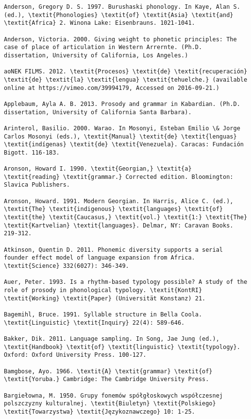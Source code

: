 \begin{verbatim}
Anderson, Gregory D. S. 1997. Burushaski phonology. In Kaye, Alan S. (ed.), \textit{Phonologies} \textit{of} \textit{Asia} \textit{and} \textit{Africa} 2. Winona Lake: Eisenbrauns. 1021-1041.

Anderson, Victoria. 2000. Giving weight to phonetic principles: The case of place of articulation in Western Arrernte. (Ph.D. dissertation, University of California, Los Angeles.)

aoNEK FILMS. 2012. \textit{Procesos} \textit{de} \textit{recuperación} \textit{de} \textit{la} \textit{lengua} \textit{tehuelche.} (available online at https://vimeo.com/39994179, Accessed on 2016-09-21.)

Applebaum, Ayla A. B. 2013. Prosody and grammar in Kabardian. (Ph.D. dissertation, University of California Santa Barbara).

Arinterol, Basilio. 2000. Warao. In Mosonyi, Esteban Emilio \& Jorge Carlos Mosonyi (eds.), \textit{Manual} \textit{de} \textit{lenguas} \textit{indígenas} \textit{de} \textit{Venezuela}. Caracas: Fundación Bigott. 116-183.

Aronson, Howard I. 1990. \textit{Georgian,} \textit{a} \textit{reading} \textit{grammar.} Corrected edition. Bloomington: Slavica Publishers.

Aronson, Howard. 1991. Modern Georgian. In Harris, Alice C. (ed.), \textit{The} \textit{indigenous} \textit{languages} \textit{of} \textit{the} \textit{Caucasus,} \textit{vol.} \textit{1:} \textit{The} \textit{Kartvelian} \textit{languages}. Delmar, NY: Caravan Books. 219-312.

Atkinson, Quentin D. 2011. Phonemic diversity supports a serial founder effect model of language expansion from Africa. \textit{Science} 332(6027): 346-349.

Auer, Peter. 1993. Is a rhythm-based typology possible? A study of the role of prosody in phonological typology. \textit{KontRI} \textit{Working} \textit{Paper} (Universität Konstanz) 21.

Bagemihl, Bruce. 1991. Syllable structure in Bella Coola. \textit{Linguistic} \textit{Inquiry} 22(4): 589-646.

Bakker, Dik. 2011. Language sampling. In Song, Jae Jung (ed.), \textit{Handbook} \textit{of} \textit{linguistic} \textit{typology}. Oxford: Oxford University Press. 100-127.

Bamgbose, Ayo. 1966. \textit{A} \textit{grammar} \textit{of} \textit{Yoruba.} Cambridge: The Cambridge University Press.

Bargiełowna, M. 1950. Grupy fonemów spółgłoskowych współczesnej polszczyzny kulturalnej. \textit{Biuletyn} \textit{Polskiego} \textit{Towarzystwa} \textit{Językoznawczego} 10: 1-25.


\end{verbatim}
